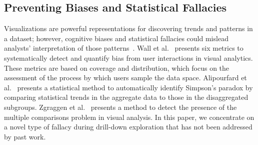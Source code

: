 \subsection{Preventing Biases and Statistical Fallacies}
Visualizations are powerful representations for discovering trends and patterns in a dataset; however, cognitive biases and statistical fallacies could mislead analysts' interpretation of those patterns~\cite{Alipourfard2018WSDM,Wall2017,Zgraggen2018CHI}. Wall et al.~\cite{Wall2017} presents six metrics to systematically detect and quantify bias from user interactions in visual analytics. These metrics are based on coverage and distribution, which focus on the assessment of the process by which users sample the data space. Alipourfard et al.~\cite{Alipourfard2018WSDM} presents a statistical method to automatically identify Simpson's paradox by comparing statistical trends in the aggregate data to those in the disaggregated subgroups. Zgraggen et al.~\cite{Zgraggen2018CHI} presents a method to detect the presence of the multiple comparisons problem in visual analysis. In this paper, we concentrate on a novel type of fallacy during drill-down exploration that has not been addressed by past work. %
